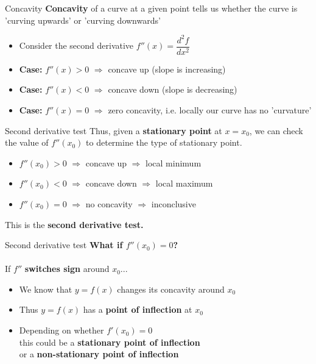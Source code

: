 \documentclass{beamer}
\begin{document}
\begin{frame}{Concavity}
	\textbf{Concavity} of a curve at a given point tells us whether the curve is 'curving upwards' or 'curving downwards'
	\begin{itemize}
		\item Consider the second derivative $f''(x) = \dfrac{d^2f}{dx^2}$
		\item \textbf{Case: } $f''(x) > 0$ $\Rightarrow$ concave up (slope is increasing)
		\item \textbf{Case: } $f''(x) < 0$ $\Rightarrow$ concave down (slope is decreasing)
		\item \textbf{Case: } $f''(x) = 0$ $\Rightarrow$ zero concavity, i.e. locally our curve has no 'curvature'
	\end{itemize}
\end{frame}

\begin{frame}{Second derivative test}
	Thus, given a \textbf{stationary point} at $x = x_0$, we can check the value of $f''(x_0)$ to determine the type of stationary point.
		
	\begin{itemize}
		\item $f''(x_0) > 0$ $\Rightarrow$ concave up $\Rightarrow$ local minimum
		\item $f''(x_0) < 0$ $\Rightarrow$ concave down $\Rightarrow$ local maximum
		\item $f''(x_0) = 0$ $\Rightarrow$ no concavity $\Rightarrow$ inconclusive
	\end{itemize}
	
	This is the \textbf{second derivative test.}
\end{frame}


\begin{frame}{Second derivative test}
	\textbf{What if $f''(x_0) = 0$?}
	\\~\\
	If $f''$ \textbf{switches sign} around $x_0$...
	\begin{itemize}
		\item We know that $y = f(x)$ changes its concavity around $x_0$
		\item Thus $y = f(x)$ has a \textbf{point of inflection} at $x_0$
		\item Depending on whether $f'(x_0) = 0$\\	this could be a \textbf{stationary point of inflection}\\or a \textbf{non-stationary point of inflection}
	\end{itemize}
\end{frame}
\end{document}
